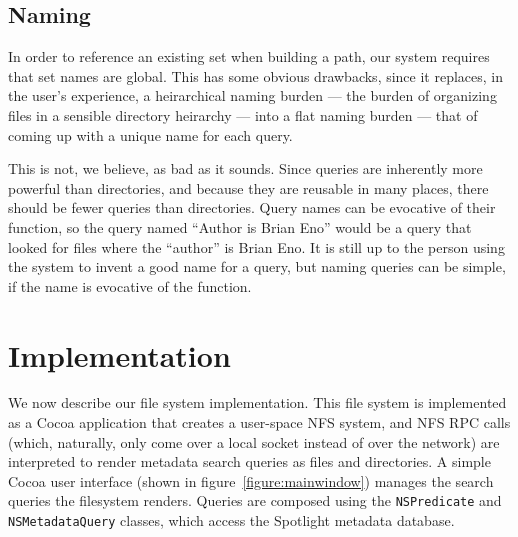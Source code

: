 \documentclass{article}
\begin{document}
\subsection{Naming}

In order to reference an existing set when building a path, our system
requires that set names are global. This has some obvious drawbacks,
since it replaces, in the user's experience, a heirarchical naming
burden --- the burden of organizing files in a sensible directory
heirarchy --- into a flat naming burden --- that of coming up with a
unique name for each query.

This is not, we believe, as bad as it sounds. Since queries are
inherently more powerful than directories, and because they are
reusable in many places, there should be fewer queries than
directories. Query names can be evocative of their function, so the
query named ``Author is Brian Eno'' would be a query that looked for
files where the ``author'' is Brian Eno. It is still up to the person
using the system to invent a good name for a query, but naming queries
can be simple, if the name is evocative of the function. 

\section{Implementation}

We now describe our file system implementation. This file system is
implemented as a Cocoa application that creates a user-space NFS
system, and NFS RPC calls (which, naturally, only come over a local
socket instead of over the network) are interpreted to render metadata
search queries as files and directories. A simple Cocoa user interface
(shown in figure~\ref{figure:mainwindow}) manages the search queries
the filesystem renders. Queries are composed using the
\texttt{NSPredicate} and \texttt{NSMetadataQuery} classes, which
access the Spotlight metadata database.
\end{document}
